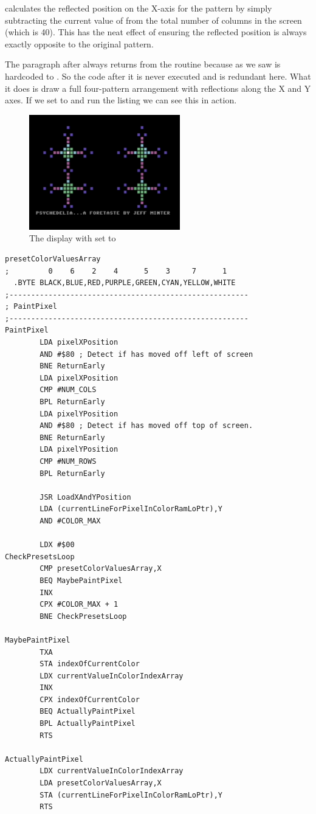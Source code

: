  calculates the reflected position on the X-axis for the pattern by simply subtracting the current value
of  from the total number of columns in the screen (which is 40). This has the neat effect of ensuring
the reflected position is always exactly opposite to the original pattern.

The paragraph after  always returns from the routine because as we saw  is
hardcoded to . So the code after it is never executed and is redundant here. What it does is draw a full four-pattern
arrangement with reflections along the X and Y axes. If we set  to  and run the
listing we can see this in action.


\begin{figure}[H]
    \centering
      \includegraphics[height=5cm]{src/listing_commentary/four_pattern.png}
  \caption*{The display with  set to }
\end{figure}


\clearpage
\begin{lstlisting}[caption=Where the painting is actually done.]
presetColorValuesArray
;         0    6    2    4      5    3     7      1
  .BYTE BLACK,BLUE,RED,PURPLE,GREEN,CYAN,YELLOW,WHITE
;-------------------------------------------------------
; PaintPixel
;-------------------------------------------------------
PaintPixel   
        LDA pixelXPosition
        AND #$80 ; Detect if has moved off left of screen
        BNE ReturnEarly
        LDA pixelXPosition
        CMP #NUM_COLS
        BPL ReturnEarly
        LDA pixelYPosition
        AND #$80 ; Detect if has moved off top of screen.
        BNE ReturnEarly
        LDA pixelYPosition
        CMP #NUM_ROWS
        BPL ReturnEarly

        JSR LoadXAndYPosition
        LDA (currentLineForPixelInColorRamLoPtr),Y
        AND #COLOR_MAX

        LDX #$00
CheckPresetsLoop   
        CMP presetColorValuesArray,X
        BEQ MaybePaintPixel
        INX 
        CPX #COLOR_MAX + 1
        BNE CheckPresetsLoop

MaybePaintPixel   
        TXA 
        STA indexOfCurrentColor
        LDX currentValueInColorIndexArray
        INX 
        CPX indexOfCurrentColor
        BEQ ActuallyPaintPixel
        BPL ActuallyPaintPixel
        RTS 

ActuallyPaintPixel   
        LDX currentValueInColorIndexArray
        LDA presetColorValuesArray,X
        STA (currentLineForPixelInColorRamLoPtr),Y
        RTS 
\end{lstlisting}
\clearpage

